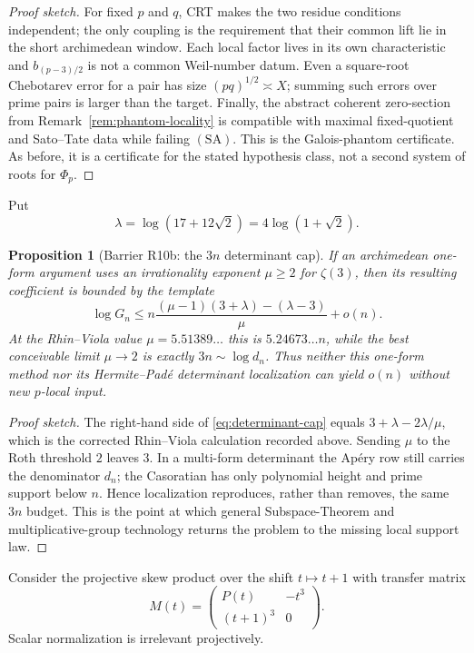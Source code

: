 \documentclass[11pt]{amsart}
\theoremstyle{plain}
\newtheorem{proposition}{Proposition}
\theoremstyle{remark}
\begin{document}
\begin{proof}[Proof sketch]
For fixed $p$ and $q$, CRT makes the two residue conditions independent;
the only coupling is the requirement that their common lift lie in the
short archimedean window.  Each local factor lives in its own
characteristic and $b_{(p-3)/2}$ is not a common Weil-number datum.
Even a square-root Chebotarev error for a pair has size
$(pq)^{1/2}\asymp X$; summing such errors over prime pairs is larger
than the target.  Finally, the abstract coherent zero-section from
Remark~\ref{rem:phantom-locality} is compatible with maximal
fixed-quotient and Sato--Tate data while failing $(\mathrm{SA})$.
This is the Galois-phantom certificate.  As before, it is a certificate
for the stated hypothesis class, not a second system of roots for
$\Phi_p$.
\end{proof}

Put
\[
 \lambda=\log(17+12\sqrt2)=4\log(1+\sqrt2).
\]

\begin{proposition}[Barrier R10b: the $3n$ determinant cap]
\label{prop:determinant-cap}
If an archimedean one-form argument uses an irrationality exponent
$\mu\geq2$ for $\zeta(3)$, then its resulting coefficient is bounded
by the template
\[
 \log G_n\leq
 n\frac{(\mu-1)(3+\lambda)-(\lambda-3)}{\mu}+o(n).
 \tag{8.10}\label{eq:determinant-cap}
\]
At the Rhin--Viola value $\mu=5.51389\ldots$ this is
$5.24673\ldots n$, while the best conceivable limit $\mu\to2$ is
exactly $3n\sim\log d_n$.  Thus neither this one-form method nor its
Hermite--Pad\'e determinant localization can yield $o(n)$ without new
$p$-local input.
\end{proposition}

\begin{proof}[Proof sketch]
The right-hand side of \eqref{eq:determinant-cap} equals
$3+\lambda-2\lambda/\mu$, which is the corrected Rhin--Viola
calculation recorded above.  Sending $\mu$ to the Roth threshold $2$
leaves $3$.  In a multi-form determinant the Ap\'ery row still carries
the denominator $d_n$; the Casoratian has only polynomial height and
prime support below $n$.  Hence localization reproduces, rather than
removes, the same $3n$ budget.  This is the point at which general
Subspace-Theorem and multiplicative-group technology
\cite{Schmidt1980,EvertseSchlickeweiSchmidt2002,
BugeaudCorvajaZannier2003} returns the problem to the missing local
support law.
\end{proof}

Consider the projective skew product over the shift $t\mapsto t+1$
with transfer matrix
\[
 M(t)=
 \begin{pmatrix}
 P(t)&-t^3\\ (t+1)^3&0
 \end{pmatrix}.
 \tag{8.11}\label{eq:mobius-cocycle}
\]
Scalar normalization is irrelevant projectively.
\end{document}
